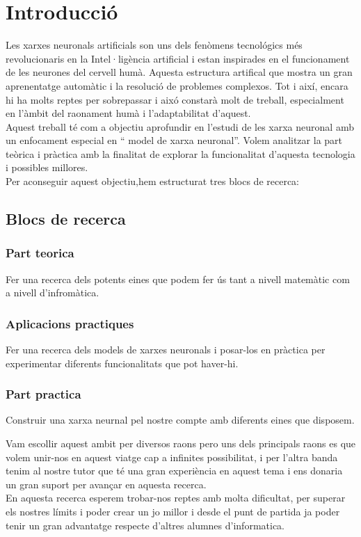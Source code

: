 \chapter{Introducció}
\label{c:intro}

Les xarxes neuronals artificials son uns dels fenòmens tecnológics més revolucionaris en la Intel·ligència artificial i estan inspirades en el funcionament de les neurones del cervell humà. Aquesta estructura artifical que mostra un gran aprenentatge automàtic i la resolució de problemes complexos. Tot i així, encara hi ha molts reptes per sobrepassar i aixó constarà molt de treball, especialment en l'àmbit del raonament humà i l'adaptabilitat d'aquest.\\
Aquest treball té com a objectiu aprofundir en l'estudi de les xarxa neuronal amb un enfocament especial en `` model de xarxa neuronal''. Volem analitzar la part teòrica i pràctica amb la finalitat de explorar la funcionalitat d'aquesta tecnologia i possibles millores.\\
Per aconseguir aquest objectiu,hem estructurat tres blocs de recerca:
\section{Blocs de recerca}
\subsection{Part teorica}
Fer una recerca dels potents eines que podem fer ús tant a nivell matemàtic com a nivell  d'infromàtica.
\subsection{Aplicacions practiques}
Fer una recerca dels models de xarxes neuronals i posar-los en pràctica per experimentar diferents funcionalitats que pot haver-hi.
\subsection{Part practica }
Construir una xarxa neurnal pel nostre compte amb diferents eines que disposem.

Vam escollir aquest ambit per diversos raons pero uns dels principals raons es que volem unir-nos en aquest viatge cap  a infinites possibilitat, i per l'altra banda tenim al nostre tutor que té una gran experiència en aquest tema i ens donaria un gran suport per avançar en aquesta recerca.\\
En aquesta recerca esperem trobar-nos reptes amb molta dificultat, per superar els nostres límits i poder crear un jo millor i desde el punt de partida ja poder tenir un gran advantatge respecte d'altres alumnes d'informatica.






